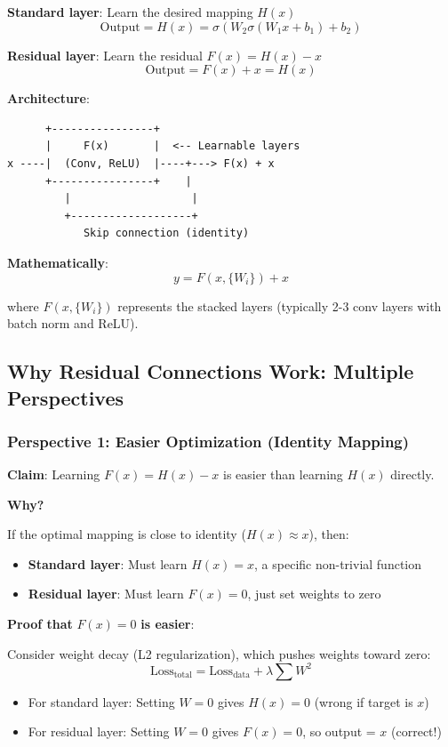 \textbf{Standard layer}: Learn the desired mapping $H(x)$
\[
\text{Output} = H(x) = \sigma(W_2\sigma(W_1 x + b_1) + b_2)
\]

\textbf{Residual layer}: Learn the residual $F(x) = H(x) - x$
\[
\text{Output} = F(x) + x = H(x)
\]

\textbf{Architecture}:
\begin{verbatim}
      +----------------+
      |     F(x)       |  <-- Learnable layers
x ----|  (Conv, ReLU)  |----+---> F(x) + x
      +----------------+    |
         |                   |
         +-------------------+
            Skip connection (identity)
\end{verbatim}

\textbf{Mathematically}:
\[
y = F(x, \{W_i\}) + x
\]

where $F(x, \{W_i\})$ represents the stacked layers (typically 2-3 conv layers with batch norm and ReLU).

\subsection{Why Residual Connections Work: Multiple Perspectives}

\subsubsection{Perspective 1: Easier Optimization (Identity Mapping)}

\textbf{Claim}: Learning $F(x) = H(x) - x$ is easier than learning $H(x)$ directly.

\textbf{Why?}

If the optimal mapping is close to identity ($H(x) \approx x$), then:
\begin{itemize}
\item \textbf{Standard layer}: Must learn $H(x) = x$, a specific non-trivial function
\item \textbf{Residual layer}: Must learn $F(x) = 0$, just set weights to zero
\end{itemize}

\textbf{Proof that} $F(x) = 0$ \textbf{is easier}:

Consider weight decay (L2 regularization), which pushes weights toward zero:
\[
\text{Loss}_{\text{total}} = \text{Loss}_{\text{data}} + \lambda \sum W^2
\]

\begin{itemize}
\item For standard layer: Setting $W = 0$ gives $H(x) = 0$ (wrong if target is $x$)
\item For residual layer: Setting $W = 0$ gives $F(x) = 0$, so output = $x$ (correct!)
\end{itemize}

